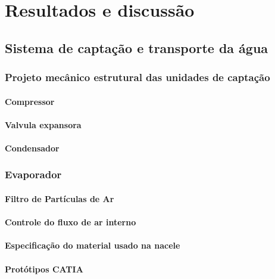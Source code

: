 \chapter[Resultados]{Resultados e discussão}
 
  \section{Sistema de captação e transporte da água}
    \subsection{Projeto mecânico estrutural das unidades de captação}
    	\subsubsection{Compressor}
   			
   		\subsubsection{Valvula expansora}
   			
   		\subsubsection{Condensador}
   			
   		\subsection{Evaporador}
   			
   		\subsubsection{Filtro de Partículas de Ar}
   			
   		\subsubsection{Controle do fluxo de ar interno}
   			
   		\subsubsection{Especificação do material usado na nacele}
   			
   		\subsubsection{Protótipos CATIA}
   			
    
